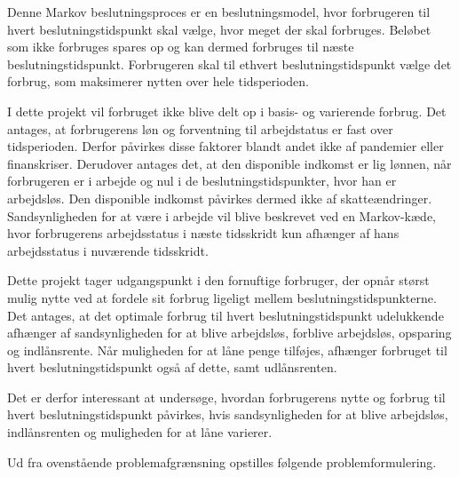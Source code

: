 Denne Markov beslutningsproces er en beslutningsmodel, hvor forbrugeren til hvert beslutningstidspunkt skal vælge, hvor meget der skal forbruges. Beløbet som ikke forbruges spares op og kan dermed forbruges til næste beslutningstidspunkt. Forbrugeren skal til ethvert beslutningstidspunkt vælge det forbrug, som maksimerer nytten over hele tidsperioden. %

I dette projekt vil forbruget ikke blive delt op i basis- og varierende forbrug. Det antages, at forbrugerens løn og forventning til arbejdstatus er fast over tidsperioden. Derfor påvirkes disse faktorer blandt andet ikke af pandemier eller finanskriser. Derudover antages det, at den disponible indkomst er lig lønnen, når forbrugeren er i arbejde og nul i de beslutningstidspunkter, hvor han er arbejdsløs. Den disponible indkomst påvirkes dermed ikke af skatteændringer. Sandsynligheden for at være i arbejde vil blive beskrevet ved en Markov-kæde, hvor forbrugerens arbejdsstatus i næste tidsskridt kun afhænger af hans arbejdsstatus i nuværende tidsskridt.

Dette projekt tager udgangspunkt i den fornuftige forbruger, der opnår størst mulig nytte ved at fordele sit forbrug ligeligt mellem beslutningstidspunkterne. Det antages, at det optimale forbrug til hvert beslutningstidspunkt udelukkende afhænger af sandsynligheden for at blive arbejdsløs, forblive arbejdsløs, opsparing og indlånsrente. Når muligheden for at låne penge tilføjes, afhænger forbruget til hvert beslutningstidspunkt også af dette, samt udlånsrenten.

Det er derfor interessant at undersøge, hvordan forbrugerens nytte og forbrug til hvert beslutningstidspunkt påvirkes, hvis sandsynligheden for at blive arbejdsløs, indlånsrenten og muligheden for at låne varierer. 




Ud fra ovenstående problemafgrænsning opstilles følgende problemformulering.





 



